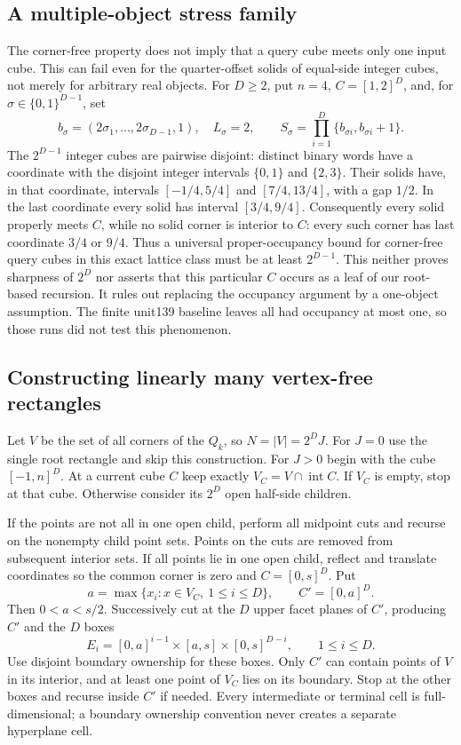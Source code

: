 \subsection{A multiple-object stress family}
The corner-free property does not imply that a query cube meets only one
input cube. This can fail even for the quarter-offset solids of equal-side
integer cubes, not merely for arbitrary real objects. For $D\geq2$, put
$n=4$, $C=[1,2]^D$, and, for $\sigma\in\{0,1\}^{D-1}$, set
\[
 b_\sigma=(2\sigma_1,\ldots,2\sigma_{D-1},1),\quad L_\sigma=2,
 \qquad S_\sigma=\prod_{i=1}^D\{b_{\sigma i},b_{\sigma i}+1\}.
\]
The $2^{D-1}$ integer cubes are pairwise disjoint: distinct binary words
have a coordinate with the disjoint integer intervals $\{0,1\}$ and
$\{2,3\}$. Their solids have, in that coordinate, intervals
$[-1/4,5/4]$ and $[7/4,13/4]$, with a gap $1/2$.
In the last coordinate every solid has interval $[3/4,9/4]$.
Consequently every solid properly meets $C$, while no solid corner is
interior to $C$: every such corner has last coordinate $3/4$ or $9/4$.
Thus a universal proper-occupancy bound for corner-free query cubes in
this exact lattice class must be at least $2^{D-1}$. This neither proves
sharpness of $2^D$ nor asserts that this particular $C$ occurs as a leaf
of our root-based recursion. It rules out replacing the occupancy
argument by a one-object assumption. The finite unit139 baseline leaves
all had occupancy at most one, so those runs did not test this phenomenon.
\subsection{Constructing linearly many vertex-free rectangles}
Let $V$ be the set of all corners of the $Q_k$, so $N=|V|=2^DJ$.
For $J=0$ use the single root rectangle and skip this construction.
For $J>0$ begin with the cube $[-1,n]^D$. At a current cube $C$ keep
exactly $V_C=V\cap\operatorname{int}C$.
If $V_C$ is empty, stop at that cube. Otherwise consider its $2^D$ open
half-side children.

If the points are not all in one open child, perform all midpoint cuts
and recurse on the nonempty child point sets. Points on the cuts are
removed from subsequent interior sets. If all points lie in one open
child, reflect and translate coordinates so the common corner is zero
and $C=[0,s]^D$. Put
\[
 a=\max\{x_i:x\in V_C,\ 1\leq i\leq D\},\qquad C'=[0,a]^D.
\]
Then $0<a<s/2$. Successively cut at the $D$ upper facet planes of $C'$,
producing $C'$ and the $D$ boxes
\[
 E_i=[0,a]^{i-1}\times[a,s]\times[0,s]^{D-i},\qquad1\leq i\leq D.
\]
Use disjoint boundary ownership for these boxes. Only $C'$ can contain
points of $V$ in its interior, and at least one point of $V_C$ lies on
its boundary. Stop at the other boxes and recurse inside $C'$ if needed.
Every intermediate or terminal cell is full-dimensional; a boundary
ownership convention never creates a separate hyperplane cell.

